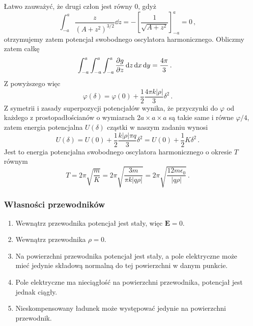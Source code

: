 \documentclass[../main.tex]{subfiles}
\begin{document}
Łatwo zauważyć, że drugi człon jest równy 0, gdyż
\begin{equation*}
    \int_{-a}^a\frac{z}{(A+z^2)^{3/2}}\dd{z}=-\left[\frac{1}{\sqrt{A+z^2}}\right]_{-a}^a=0\,,
\end{equation*}
otrzymujemy zatem potencjał swobodnego oscylatora harmonicznego. Obliczmy zatem całkę
\begin{equation*}
\begin{split}
    &\int_{-a}^a\int_{-a}^a\int_{-a}^a\pdv{g}{z}\dd{z}\dd{x}\dd{y}=\frac{4\pi}{3}\,.
\end{split}
\end{equation*}
Z powyższego więc
\begin{equation*}
    \varphi(\delta)=\varphi(0)+\frac{1}{2}\frac{4\pi k|\rho|}{3}\delta^2\,.
\end{equation*}
Z symetrii i zasady superpozycji potencjałów wynika, że przyczynki do \(\varphi\) od każdego z
prostopadłościanów o wymiarach \(2a\times a \times a\) są takie same i równe \(\varphi/4\), zatem
energia potencjalna \(U(\delta)\) cząstki w naszym zadaniu wynosi
\begin{equation*}
    U(\delta)=U(0)+\frac{1}{2}\frac{k|\rho|\pi q}{3}\delta ^2=U(0)+\frac{1}{2}K \delta^2\,.
\end{equation*}
Jest to energia potencjalna swobodnego oscylatora harmonicznego o okresie \(T\) równym
\begin{equation*}
    T=2\pi\sqrt{\frac{m}{K}}=2\pi\sqrt{\frac{3m}{\pi k |q\rho| }}=2\pi\sqrt{\frac{12m\epsilon_0}{|q\rho| }}\,.
\end{equation*}
\subsubsection{Własności przewodników}
\begin{enumerate}
    \item Wewnątrz przewodnika potencjał jest stały, więc \(\mathbf{E}=0\).
    \item Wewnątrz przewodnika \(\rho=0\).
    \item Na powierzchni przewodnika potencjał jest stały, a pole elektryczne może mieć jedynie
    składową normalną do tej powierzchni w danym punkcie.
    \item Pole elektryczne ma nieciągłość na powierzchni przewodnika, potencjał jest jednak ciągły.
    \item Nieskompensowany ładunek może występować jedynie na powierzchni przewodnik.
\end{enumerate}
\end{document}
